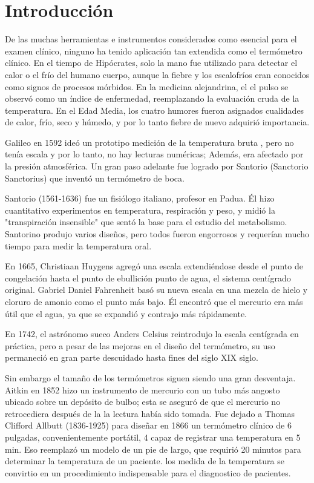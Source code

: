 \section{Introducción}
\par 
De las muchas herramientas e instrumentos considerados como
esencial para el examen clínico, ninguno ha tenido
aplicación tan extendida como el termómetro clínico.
En el tiempo de Hipócrates, solo la mano
fue utilizado para detectar el calor o el frío del humano
cuerpo, aunque la fiebre y los escalofríos eran conocidos como signos
de procesos mórbidos. En la medicina alejandrina, el
el pulso se observó como un índice de enfermedad, reemplazando
la evaluación cruda de la temperatura. En el
Edad Media, los cuatro humores fueron asignados
cualidades de calor, frío, seco y húmedo, y por lo tanto fiebre
de nuevo adquirió importancia.

\par \noindent
Galileo en 1592 ideó un prototipo medición de la temperatura bruta
, pero no tenía escala y
por lo tanto, no hay lecturas numéricas; Además, era
afectado por la presión atmosférica. Un gran paso
adelante fue logrado por Santorio (Sanctorio
Sanctorius) que inventó un termómetro de boca.

\par \noindent
Santorio (1561-1636) fue un fisiólogo italiano,
profesor en Padua. Él hizo cuantitativo
experimentos en temperatura, respiración y peso,
y midió la "transpiración insensible" que sentó
la base para el estudio del metabolismo. Santorino produjo varios diseños, pero todos fueron
engorrosos y requerían mucho tiempo para medir la temperatura oral.

\par \noindent
En 1665, Christiaan Huygens agregó una escala
extendiéndose desde el punto de congelación hasta el punto de ebullición
punto de agua, el sistema centígrado original.
Gabriel Daniel Fahrenheit basó su nueva escala
en una mezcla de hielo y cloruro de amonio como
el punto más bajo. Él encontró que el mercurio era más útil
que el agua, ya que se expandió y contrajo más
rápidamente.\cite{intro-historia}

\par \noindent
En 1742, el astrónomo sueco Anders Celsius
reintrodujo la escala centígrada en práctica, pero
a pesar de las mejoras en el diseño del termómetro,
su uso permaneció en gran parte descuidado hasta fines del siglo XIX
siglo.

\par \noindent
Sin embargo el tamaño de
los termómetros siguen siendo una gran desventaja.
Aitkin en 1852 hizo un instrumento de mercurio con un
tubo más angosto ubicado sobre un depósito de bulbo; esta
se aseguró de que el mercurio no retrocediera después de la
la lectura había sido tomada. Fue dejado a Thomas
Clifford Allbutt (1836-1925) para diseñar en 1866
un termómetro clínico de 6 pulgadas, convenientemente portátil, 4
capaz de registrar una temperatura en 5 min. Eso
reemplazó un modelo de un pie de largo, que requirió 20
minutos para determinar la temperatura de un paciente. los
medida de la temperatura se convirtio en un procedimiento indispensable para el diagnostico de pacientes.

